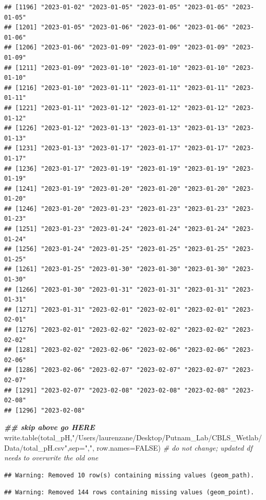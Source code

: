 \documentclass[
]{article}
\newenvironment{Shaded}{\begin{snugshade}}{\end{snugshade}}
\newcommand{\AttributeTok}[1]{\textcolor[rgb]{0.77,0.63,0.00}{#1}}
\newcommand{\CommentTok}[1]{\textcolor[rgb]{0.56,0.35,0.01}{\textit{#1}}}
\newcommand{\ConstantTok}[1]{\textcolor[rgb]{0.00,0.00,0.00}{#1}}
\newcommand{\DocumentationTok}[1]{\textcolor[rgb]{0.56,0.35,0.01}{\textbf{\textit{#1}}}}
\newcommand{\FunctionTok}[1]{\textcolor[rgb]{0.00,0.00,0.00}{#1}}
\newcommand{\NormalTok}[1]{#1}
\newcommand{\StringTok}[1]{\textcolor[rgb]{0.31,0.60,0.02}{#1}}
\begin{document}
\begin{verbatim}
## [1196] "2023-01-02" "2023-01-05" "2023-01-05" "2023-01-05" "2023-01-05"
## [1201] "2023-01-05" "2023-01-06" "2023-01-06" "2023-01-06" "2023-01-06"
## [1206] "2023-01-06" "2023-01-09" "2023-01-09" "2023-01-09" "2023-01-09"
## [1211] "2023-01-09" "2023-01-10" "2023-01-10" "2023-01-10" "2023-01-10"
## [1216] "2023-01-10" "2023-01-11" "2023-01-11" "2023-01-11" "2023-01-11"
## [1221] "2023-01-11" "2023-01-12" "2023-01-12" "2023-01-12" "2023-01-12"
## [1226] "2023-01-12" "2023-01-13" "2023-01-13" "2023-01-13" "2023-01-13"
## [1231] "2023-01-13" "2023-01-17" "2023-01-17" "2023-01-17" "2023-01-17"
## [1236] "2023-01-17" "2023-01-19" "2023-01-19" "2023-01-19" "2023-01-19"
## [1241] "2023-01-19" "2023-01-20" "2023-01-20" "2023-01-20" "2023-01-20"
## [1246] "2023-01-20" "2023-01-23" "2023-01-23" "2023-01-23" "2023-01-23"
## [1251] "2023-01-23" "2023-01-24" "2023-01-24" "2023-01-24" "2023-01-24"
## [1256] "2023-01-24" "2023-01-25" "2023-01-25" "2023-01-25" "2023-01-25"
## [1261] "2023-01-25" "2023-01-30" "2023-01-30" "2023-01-30" "2023-01-30"
## [1266] "2023-01-30" "2023-01-31" "2023-01-31" "2023-01-31" "2023-01-31"
## [1271] "2023-01-31" "2023-02-01" "2023-02-01" "2023-02-01" "2023-02-01"
## [1276] "2023-02-01" "2023-02-02" "2023-02-02" "2023-02-02" "2023-02-02"
## [1281] "2023-02-02" "2023-02-06" "2023-02-06" "2023-02-06" "2023-02-06"
## [1286] "2023-02-06" "2023-02-07" "2023-02-07" "2023-02-07" "2023-02-07"
## [1291] "2023-02-07" "2023-02-08" "2023-02-08" "2023-02-08" "2023-02-08"
## [1296] "2023-02-08"
\end{verbatim}

\begin{Shaded}
\begin{Highlighting}[]
\DocumentationTok{\#\# skip above go HERE}
\FunctionTok{write.table}\NormalTok{(total\_pH,}\StringTok{"/Users/laurenzane/Desktop/Putnam\_Lab/CBLS\_Wetlab/Data/total\_pH.csv"}\NormalTok{,}\AttributeTok{sep=}\StringTok{","}\NormalTok{, }\AttributeTok{row.names=}\ConstantTok{FALSE}\NormalTok{) }\CommentTok{\# do not change; updated df needs to overwrite the old one}
\end{Highlighting}
\end{Shaded}

\begin{verbatim}
## Warning: Removed 10 row(s) containing missing values (geom_path).
\end{verbatim}

\begin{verbatim}
## Warning: Removed 144 rows containing missing values (geom_point).
\end{verbatim}
\end{document}
